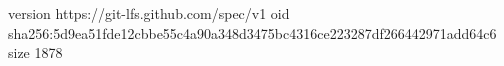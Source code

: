 version https://git-lfs.github.com/spec/v1
oid sha256:5d9ea51fde12cbbe55c4a90a348d3475bc4316ce223287df266442971add64c6
size 1878
